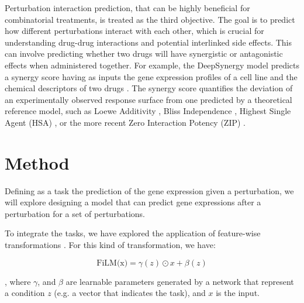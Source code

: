 \documentclass[12pt, a4paper]{article}
\begin{document}
Perturbation interaction prediction, that can be highly beneficial for combinatorial treatments, is treated as the third objective. The goal is to predict how different perturbations interact with each other, which is crucial for understanding drug-drug interactions and potential interlinked side effects. This can involve predicting whether two drugs will have synergistic or antagonistic effects when administered together. For example, the DeepSynergy model predicts a synergy score having as inputs the gene expression profiles of a cell line and the chemical descriptors of two drugs \cite{preuer2018deepsynergy}. The synergy score quantifies the deviation of an experimentally observed response surface from one predicted by a theoretical reference model, such as Loewe Additivity \cite{loewe1953problem}, Bliss Independence \cite{bliss1939toxicity}, Highest Single Agent (HSA) \cite{tan2012systematic}, or the more recent Zero Interaction Potency (ZIP) \cite{yadav2015searching}.





\section{Method}

Defining as a task the prediction of the gene expression given a perturbation, we will explore designing a model that can predict gene expressions after a perturbation for a set of perturbations.

To integrate the tasks, we have explored the application of feature-wise transformations \cite{dumoulin2018feature-wise}. For this kind of transformation, we have:

\[ \text{FiLM(x)} = \gamma (z) \odot x + \beta (z) \]

, where $\gamma$, and $\beta$ are learnable parameters generated by a network that represent a condition $z$ (e.g. a vector that indicates the task), and $x$ is the input.
\end{document}

